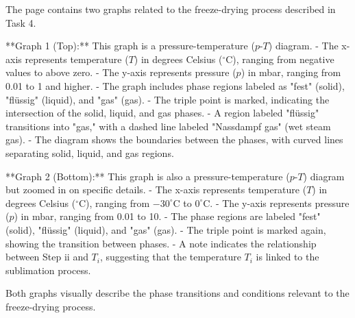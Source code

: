 The page contains two graphs related to the freeze-drying process described in Task 4.  

**Graph 1 (Top):**  
This graph is a pressure-temperature (\( p \)-\( T \)) diagram.  
- The x-axis represents temperature (\( T \)) in degrees Celsius (\( ^\circ \text{C} \)), ranging from negative values to above zero.  
- The y-axis represents pressure (\( p \)) in mbar, ranging from 0.01 to 1 and higher.  
- The graph includes phase regions labeled as "fest" (solid), "flüssig" (liquid), and "gas" (gas).  
- The triple point is marked, indicating the intersection of the solid, liquid, and gas phases.  
- A region labeled "flüssig" transitions into "gas," with a dashed line labeled "Nassdampf gas" (wet steam gas).  
- The diagram shows the boundaries between the phases, with curved lines separating solid, liquid, and gas regions.  

**Graph 2 (Bottom):**  
This graph is also a pressure-temperature (\( p \)-\( T \)) diagram but zoomed in on specific details.  
- The x-axis represents temperature (\( T \)) in degrees Celsius (\( ^\circ \text{C} \)), ranging from \(-30^\circ \text{C}\) to \( 0^\circ \text{C} \).  
- The y-axis represents pressure (\( p \)) in mbar, ranging from 0.01 to 10.  
- The phase regions are labeled "fest" (solid), "flüssig" (liquid), and "gas" (gas).  
- The triple point is marked again, showing the transition between phases.  
- A note indicates the relationship between Step ii and \( T_i \), suggesting that the temperature \( T_i \) is linked to the sublimation process.  

Both graphs visually describe the phase transitions and conditions relevant to the freeze-drying process.